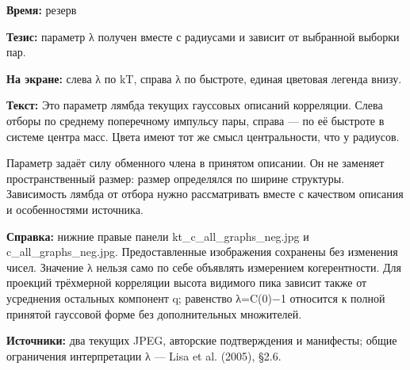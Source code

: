 \textbf{Время:} резерв

\textbf{Тезис:} параметр λ получен вместе с радиусами и зависит от выбранной выборки пар.

\textbf{На экране:} слева λ по kT, справа λ по быстроте, единая цветовая легенда внизу.

\textbf{Текст:} Это параметр лямбда текущих гауссовых описаний корреляции. Слева отборы по среднему поперечному импульсу пары, справа — по её быстроте в системе центра масс. Цвета имеют тот же смысл центральности, что у радиусов.

Параметр задаёт силу обменного члена в принятом описании. Он не заменяет пространственный размер: размер определялся по ширине структуры. Зависимость лямбда от отбора нужно рассматривать вместе с качеством описания и особенностями источника.

\textbf{Справка:} нижние правые панели kt\_c\_all\_graphs\_neg.jpg и c\_all\_graphs\_neg.jpg. Предоставленные изображения сохранены без изменения чисел. Значение λ нельзя само по себе объявлять измерением когерентности. Для проекций трёхмерной корреляции высота видимого пика зависит также от усреднения остальных компонент q; равенство λ=C(0)−1 относится к полной принятой гауссовой форме без дополнительных множителей.

\textbf{Источники:} два текущих JPEG, авторские подтверждения и манифесты; общие ограничения интерпретации λ — Lisa et al. (2005), §2.6.
